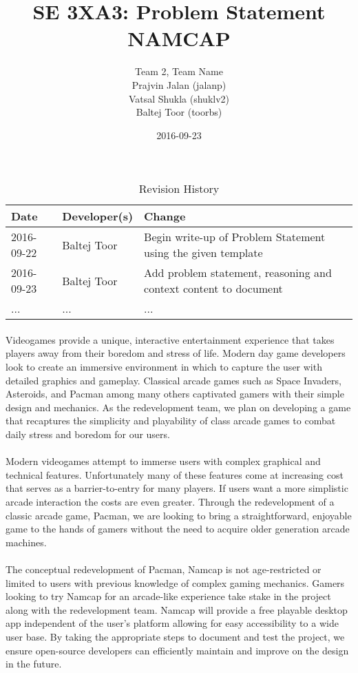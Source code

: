 \documentclass{article}
\title{SE 3XA3: Problem Statement\\NAMCAP}
\author{Team 2, Team Name
		\\ Prajvin Jalan (jalanp)
		\\ Vatsal Shukla (shuklv2)
		\\ Baltej Toor (toorbs)
}
\date{2016-09-23}
\begin{document}
\begin{table}[hp]
\caption{Revision History} \label{TblRevisionHistory}
\begin{tabularx}{\textwidth}{llX}
\toprule
\textbf{Date} & \textbf{Developer(s)} & \textbf{Change}\\
\midrule
2016-09-22 & Baltej Toor & Begin write-up of Problem Statement using the given
template\\
2016-09-23 & Baltej Toor & Add problem statement, reasoning and context content
to document\\
... & ... & ...\\
\bottomrule
\end{tabularx}
\end{table}

\newpage

\maketitle

\paragraph{}
Videogames provide a unique, interactive entertainment experience that takes
players away from their boredom and stress of life. Modern day game developers
look to create an immersive environment in which to capture the user with
detailed graphics and gameplay. Classical arcade games such as Space Invaders,
Asteroids, and Pacman among many others captivated gamers with their simple
design and mechanics. As the redevelopment team, we plan on developing a game
that recaptures the simplicity and playability of class arcade games to combat
daily stress and boredom for our users.

\paragraph{}
Modern videogames attempt to immerse users with complex graphical and technical
features. Unfortunately many of these features come at increasing cost that
serves as a barrier-to-entry for many players. If users want a more simplistic
arcade interaction the costs are even greater. Through the redevelopment of a
classic arcade game, Pacman, we are looking to bring a straightforward,
enjoyable game to the hands of gamers without the need to acquire older
generation arcade machines.

\paragraph{}
The conceptual redevelopment of Pacman, Namcap is not age-restricted or limited
to users with previous knowledge of complex gaming mechanics. Gamers looking to
try Namcap for an arcade-like experience take stake in the project along with
the redevelopment team. Namcap will provide a free playable desktop app
independent of the user's platform allowing for easy accessibility to a wide
user base. By taking the appropriate steps to document and test the project, we
ensure open-source developers can efficiently maintain and improve on the design
in the future.
\end{document}
